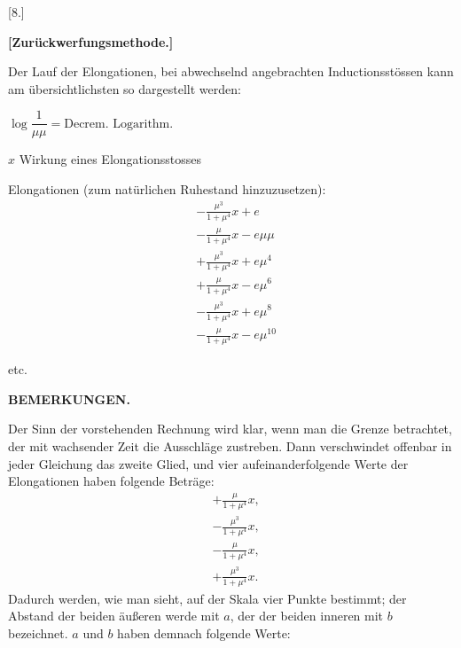 \clearpage\begingroup{}
\begin{center}[8.]\end{center}
\noindent{\small [S. 207]}
\begin{center}\textbf{[Zurückwerfungsmethode.]}\end{center}
\indent Der Lauf der Elongationen, bei abwechselnd angebrachten Inductionsstössen
kann am übersichtlichsten so dargestellt werden:
\par\noindent\hspace*{\parindent}\(\log\dfrac1{\mu\mu}=\text{Decrem. Logarithm.}\)
\par\noindent\hspace*{\parindent}\(x\) Wirkung eines Elongationsstosses
\par\noindent\hspace*{\parindent}Elongationen (zum natürlichen Ruhestand hinzuzusetzen):
\[
\begin{aligned}
&-\frac{\mu^3}{1+\mu^4}x+e\\[1ex]
&-\frac{\mu}{1+\mu^4}x-e\mu\mu\\[1ex]
&+\frac{\mu^3}{1+\mu^4}x+e\mu^4\\[1ex]
&+\frac{\mu}{1+\mu^4}x-e\mu^6\\[1ex]
&-\frac{\mu^3}{1+\mu^4}x+e\mu^8\\[1ex]
&-\frac{\mu}{1+\mu^4}x-e\mu^{10}
\end{aligned}
\]
\begin{center}etc.\end{center}
\clearpage{}
\begin{center}\textbf{BEMERKUNGEN.}\end{center}
\begingroup\small
\indent Der Sinn der vorstehenden Rechnung wird klar, wenn man die Grenze betrachtet, der mit wachsender
Zeit die Ausschläge zustreben. Dann verschwindet offenbar in jeder Gleichung das zweite Glied, und vier
aufeinanderfolgende Werte der Elongationen haben folgende Beträge:
\[
\begin{aligned}
&+\frac{\mu}{1+\mu^4}x,\\[1ex]
&-\frac{\mu^3}{1+\mu^4}x,\\[1ex]
&-\frac{\mu}{1+\mu^4}x,\\[1ex]
&+\frac{\mu^3}{1+\mu^4}x.
\end{aligned}
\]
\noindent Dadurch werden, wie man sieht, auf der Skala vier Punkte bestimmt; der Abstand der beiden äußeren
werde mit \(a\), der der beiden inneren mit \(b\) bezeichnet. \(a\) und \(b\) haben demnach folgende Werte:
